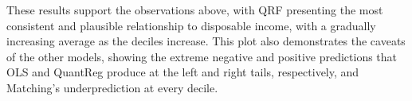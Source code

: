 These results support the observations above, with QRF presenting the most consistent and plausible relationship to disposable income, with a gradually increasing average as the deciles increase. This plot also demonstrates the caveats of the other models, showing the extreme negative and positive predictions that OLS and QuantReg produce at the left and right tails, respectively, and Matching's underprediction at every decile.